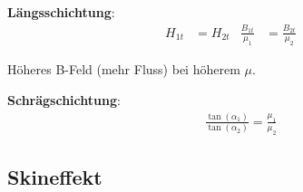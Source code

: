 \textbf{Längsschichtung}:
\begin{align*}
	H_{1t} & = H_{2t} & \frac{B_{1t}}{\mu_1} & = \frac{B_{2t}}{\mu_2} &
\end{align*}

Höheres B-Feld (mehr Fluss) bei höherem $ \mu $.

\vspace{0.5em}
\textbf{Schrägschichtung}:
\begin{align*}
	 & \frac{\tan( \alpha_1)}{\tan( \alpha_2)} = \frac{ \mu_1}{\mu_2}
\end{align*}


\newcolumn
\subsection{Skineffekt}



